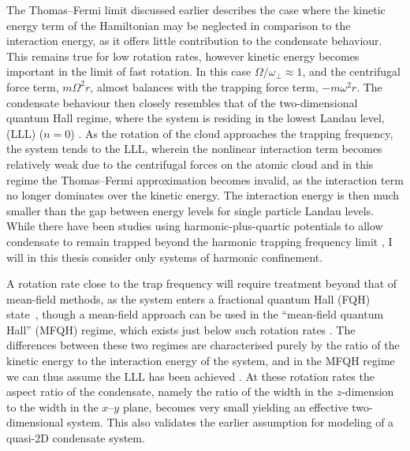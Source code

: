 The Thomas--Fermi limit discussed earlier describes the case where the kinetic energy term of the Hamiltonian may be neglected in comparison to the interaction energy, as it offers little contribution to the condensate behaviour. This remains true for low rotation rates, however kinetic energy becomes important in the limit of fast rotation. In this case $\Omega/\omega_{\perp}\approx 1$, and the centrifugal force term, $m\Omega^2r$, almost balances with the trapping force term, $-m\omega^2r$. The condensate behaviour then closely resembles that of the two-dimensional quantum Hall regime, where the system is residing in the lowest Landau level, (LLL) ($n=0$) \cite{Vtx:Ho_prl_2001}.  As the rotation of the cloud approaches the trapping frequency, the system tends to the LLL, wherein the nonlinear interaction term becomes relatively weak due to the centrifugal forces on the atomic cloud and in this regime the Thomas--Fermi approximation becomes invalid, as the interaction term no longer dominates over the kinetic energy. The interaction energy is then much smaller than the gap between energy levels for single particle Landau levels. While there have been studies using harmonic-plus-quartic potentials to allow condensate to remain trapped beyond the harmonic trapping frequency limit \cite{BEC:Bretin_prl_2004,Vtx:Ghosh_pra_2004}, I will in this thesis consider only systems of harmonic confinement.

A rotation rate close to the trap frequency will require treatment beyond that of mean-field methods, as the system enters a fractional quantum Hall (FQH) state~\cite{Vtx:Regnault_prl_2003}, though a mean-field approach can be used in the ``mean-field quantum Hall'' (MFQH) regime, which exists just below such rotation rates \cite{BEC:Fetter_revmodphys_2009}. The differences between these two regimes are characterised purely by the ratio of the kinetic energy to the interaction energy of the system, and in the MFQH regime we can thus assume the LLL has been achieved \cite{Vtx:Zhai_pra_2004,BEC:Stock_laserphyslett_2005}. At these rotation rates the aspect ratio of the condensate, namely the ratio of the width in the $z$-dimension to the width in the $x$--$y$ plane, becomes very small yielding an effective two-dimensional system. This also validates the earlier assumption for modeling of a quasi-2D condensate system.

